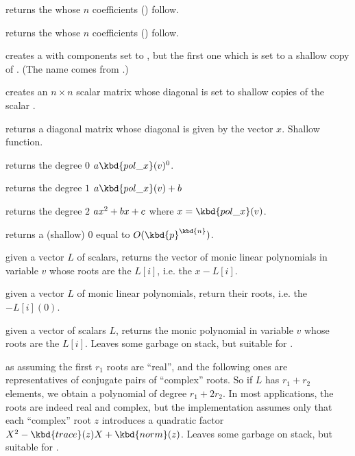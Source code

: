  returns the  whose $n$
coefficients () follow.

 returns the  whose $n$
coefficients () follow.

 creates a  with 
components set to , but the first one which is set to a shallow
copy of . (The name comes from .)

 creates an $n\times n$
scalar matrix whose diagonal is set to shallow copies of the scalar .

 returns a diagonal matrix whose diagonal
is given by the vector $x$. Shallow function.

 returns the degree $0$
 $a \kbd{pol\_x}(v)^0$.

 returns the degree $1$
 $a\kbd{pol\_x}(v) + b$

 returns the degree $2$
 $a\*x^2+b\*x+c$ where $x=\kbd{pol\_x}(v)$.

 returns a (shallow) $0$
 equal to $O(\kbd{p}^\kbd{n})$.


 given a vector $L$ of scalars,
returns the vector of monic linear polynomials in variable $v$ whose roots
are the $L[i]$, i.e. the $x - L[i]$.

 given a vector $L$ of monic linear
polynomials, return their roots, i.e. the $- L[i](0)$.

 given a vector of scalars $L$,
returns the monic polynomial in variable $v$ whose roots are the $L[i]$.
Leaves some garbage on stack, but suitable for .

 as 
assuming the first $r_1$ roots are ``real'', and the following ones are
representatives of conjugate pairs of ``complex'' roots. So if $L$ has $r_1 +
r_2$ elements, we obtain a polynomial of degree $r_1 + 2r_2$. In most
applications, the roots are indeed real and complex, but the implementation
assumes only that each ``complex'' root $z$ introduces a quadratic
factor $X^2 - \kbd{trace}(z) X + \kbd{norm}(z)$.
Leaves some garbage on stack, but suitable for .

